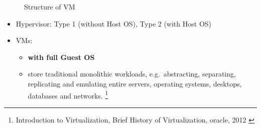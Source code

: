 \begin{frame}
\begin{figure}[h!]
        \caption{Structure of VM}
        \label{Structure of VM}
    \end{figure}
    \begin{itemize}
        \item Hypervisor: Type 1 (without Host OS), Type 2 (with Host OS)
        \item VMs:
              \begin{itemize}
                  \item \textbf{with full Guest OS}
                  \item store traditional monolithic workloads,
                        e.g.\ abstracting, separating, replicating and emulating
                        entire servers, operating systems, desktops, databases and networks.
                        \footnote{Introduction to Virtualization, Brief History of Virtualization, oracle, 2012 \cite{b2}}
              \end{itemize}
    \end{itemize}
\end{frame}


